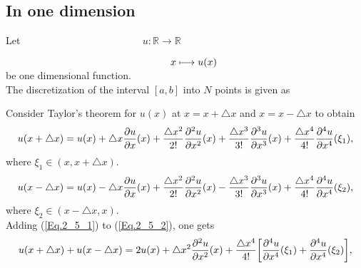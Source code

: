 \subsection*{In one dimension}
Let $\hspace{5cm} u: \mathbb{R} \longrightarrow \mathbb{R}$
\par
$ \hspace{5.8cm} x \longmapsto u(x)$
\\
be one dimensional function.
\\
The discretization of the interval $[a, b]$ into $N$ points is given as
\begin{center}
\end{center}
Consider Taylor's theorem for $u(x)$ at $x=x + \triangle x $ and $x = x - \triangle x $ to obtain 
\begin{align}{\label{Eq.2_5_1}}
u(x + \triangle x ) = u(x) + \triangle x \dfrac{\partial u}{\partial x }(x) + \dfrac{\triangle x^{2}}{2!} \dfrac{\partial^{2} u}{\partial x^{2} }(x) + \dfrac{\triangle x^{3}}{3!} \dfrac{\partial^{3} u}{\partial x^{3} }(x) + \dfrac{\triangle x^{4}}{4!} \dfrac{\partial^{4} u}{\partial x^{4} }(\xi_{1}),
\end{align}
where $ \xi_{1} \in (x , x + \triangle x)$.
\begin{align}{\label{Eq.2_5_2}}
u(x - \triangle x ) = u(x) - \triangle x \dfrac{\partial u}{\partial x }(x) + \dfrac{\triangle x^{2}}{2!} \dfrac{\partial^{2} u}{\partial x^{2} }(x) - \dfrac{\triangle x^{3}}{3!} \dfrac{\partial^{3} u}{\partial x^{3} }(x) + \dfrac{\triangle x^{4}}{4!} \dfrac{\partial^{4} u}{\partial x^{4} }(\xi_{2}),
\end{align}
where $ \xi_{2} \in (x - \triangle x, x)$.
\\
Adding (\ref{Eq.2_5_1}) to (\ref{Eq.2_5_2}), one gets
\begin{align} {\label{Eq.2_5_3}}
u(x + \triangle x ) + u(x - \triangle x ) = 2u(x) + \triangle x^{2} \dfrac{\partial^{2} u}{\partial x^{2} }(x) +  \dfrac{\triangle x^{4}}{4!} \bigg [  \dfrac{\partial^{4} u}{\partial x^{4} }(\xi_{1}) + \dfrac{\partial^{4} u}{\partial x^{4} }(\xi_{2}) \bigg ],
\end{align}
